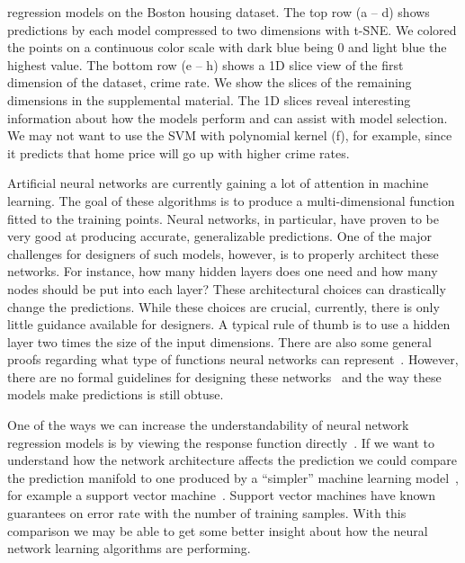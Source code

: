 \begin{figure*}[t]
{    regression models on the Boston housing dataset. The top row (a -- d) shows
    predictions by each model compressed to two dimensions with t-SNE. We
    colored the points on a continuous color scale with dark blue being 0 and
    light blue the highest value. The bottom row (e -- h) shows a 1D slice view
    of the first dimension of the dataset, crime rate. We show the slices of
    the remaining dimensions in the supplemental material. 
    The 1D slices reveal interesting information about how the models perform and
    can assist with model selection. We may not want to use the SVM with
    polynomial kernel (f), for example, since it predicts that home price will go
    up with higher crime rates.
  }
  \label{fig:nn_comp}
\end{figure*}

Artificial neural networks are currently gaining a lot of attention in machine
learning.  The goal of these algorithms is to produce a multi-dimensional
function fitted to the training points. Neural networks, in particular, have
proven to be very good at producing accurate, generalizable predictions. One of
the major challenges for designers of such models, however, is to properly
architect these networks. For instance, how many hidden layers does one need
and how many nodes should be put into each layer? These architectural choices
can drastically change the predictions.
While these choices are crucial, currently, there is only
little guidance available for designers. A typical rule of thumb is to
use a hidden layer two times the size of the input dimensions.
There are also some general proofs regarding what type of functions neural
networks can represent~\cite{Hornik:1989,Eldan:2016}. However, there are no
formal guidelines for designing these networks~\cite{Goodfellow:2016} and the
way these models make predictions is still obtuse.

One of the ways we can increase the understandability of neural network
regression models is by viewing the response function
directly~\cite{gleicher:2016}. If we want to understand how the network
architecture affects the prediction we could compare the prediction manifold to
one produced by a ``simpler'' machine learning model~\cite{Ribeiro:2016a}, for
example a support vector machine~\cite{Smola:2004}.  Support vector machines
have known guarantees on error rate with the number of training samples. With
this comparison we may be able to get some better insight about how the neural
network learning algorithms are performing.

